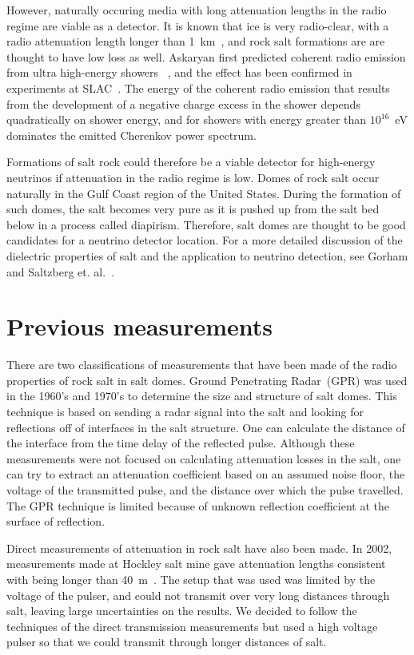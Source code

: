\documentclass{article}
\begin{document}
  However, naturally occuring media with long attenuation lengths in the radio regime are 
  viable as a detector.  It is known that ice is very radio-clear, with a radio attenuation 
  length longer 
  than 1~km~\cite{Barwick}, and rock salt formations are are thought to have low loss as well.
  Askaryan first predicted coherent radio emission from ultra high-energy showers
  ~\cite{askaryan}, and the effect has been confirmed in experiments at SLAC~\cite{saltzberg}.
  The energy of the coherent radio emission that results from the development 
  of a negative charge excess in the shower depends quadratically on shower energy, and for 
  showers with energy greater than $10^{16}$~eV dominates the emitted Cherenkov power spectrum.  
  
  Formations of salt rock could therefore be a viable detector for high-energy neutrinos if 
  attenuation in the radio regime is low.  Domes of rock salt occur naturally in the Gulf Coast 
  region of the United States.  During the formation of such domes, the salt becomes very pure 
  as it is pushed up from the salt bed below in a process called diapirism.  Therefore, salt 
  domes are thought to be good candidates for a neutrino detector location.  For a more 
  detailed discussion of the dielectric properties of salt and the application to neutrino 
  detection, see Gorham and Saltzberg et. al.~\cite{hockley}.

  \section{Previous measurements}
  There are two classifications of measurements that have been made of the radio properties 
  of rock salt in salt domes.  Ground Penetrating Radar~(GPR) was used in the 1960's and 
  1970's to determine the size and structure of salt domes.  This technique is based on sending 
  a radar signal into the salt and 
  looking for reflections off of interfaces in the salt structure.  One can calculate the 
  distance of the interface from the time delay of the reflected pulse.  Although these measurements 
  were not focused on calculating attenuation losses in the salt, one can try to extract an attenuation 
  coefficient based on an assumed noise floor, the voltage of the transmitted pulse, and the distance 
  over which the pulse travelled.  The GPR technique is limited because of unknown reflection 
  coefficient at the surface of reflection.

  Direct measurements of attenuation in rock salt have also been made.  In 2002, measurements made at 
  Hockley salt mine gave attenuation lengths consistent with being longer than 40~m~\cite{hockley}.  
  The setup that was used was limited by the voltage of the pulser, and could not transmit over 
  very long distances through salt, leaving large uncertainties on the results.  We decided 
  to follow the techniques of the direct transmission measurements but used a high voltage pulser 
  so that we could transmit through longer distances of salt.  
  
\end{document}
